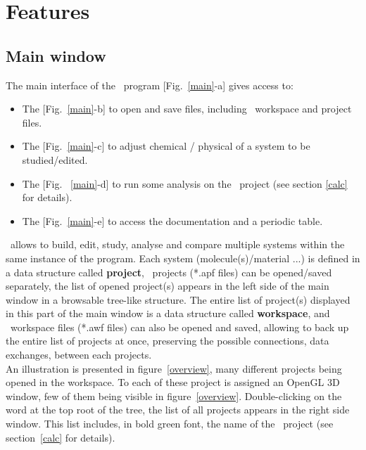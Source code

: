\chapter{Features}

\section{Main window}

\mainfig
The main interface of the \atomes\ program [Fig.~\ref{main}-a] gives access to:
\begin{itemize}
\item The  [Fig.~\ref{main}-b] to open and save files, including \atomes\ workspace and project files.
\item The  [Fig.~\ref{main}-c] to adjust chemical / physical of a system to be studied/edited.
\item The  [Fig.~ \ref{main}-d] to run some analysis on the \activp\ project (see section \ref{calc} for details).
\item The  [Fig.~\ref{main}-e] to access the documentation and a periodic table.
\end{itemize}

\atomes\ allows to build, edit, study, analyse and compare multiple systems within the same instance of the program. 
Each system (molecule(s)/material ...) is defined in a data structure called {\bf{project}}, \atomes\ projects (*.apf files) can be opened/saved separately, 
the list of opened project(s) appears in the left side of the main window in a browsable tree-like structure. 
The entire list of project(s) displayed in this part of the main window is a data structure called {\bf{workspace}}, 
and \atomes\ workspace files (*.awf files) can also be opened and saved, allowing to back up the entire list of projects at once, 
preserving the possible connections, data exchanges, between each projects. \\
An illustration is presented in figure~\ref{overview}, many different projects being opened in the workspace. 
To each of these project is assigned an OpenGL 3D window, few of them being visible in figure~\ref{overview}.  
Double-clicking on the  word at the top root of the tree, the list of all projects appears in the right side window. 
This list includes, in bold green font, the name of the \activp\ project (see section~\ref{calc} for details).

